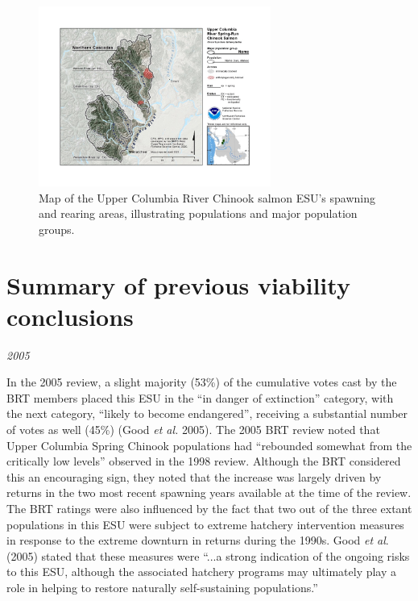 \documentclass[
  letterpaper,
  oneside,
  open=any]{scrbook}
\begin{document}
\begin{figure}

{\centering \includegraphics[width=3in,height=\textheight]{content/Interior_Columbia/../../media/image8.jpg}

}

\caption{\label{fig-UCR-Spr-Chinook-spawning-areas}Map of the Upper
Columbia River Chinook salmon ESU's spawning and rearing areas,
illustrating populations and major population groups.}

\end{figure}

\hypertarget{summary-of-previous-viability-conclusions-1}{%
\section{Summary of previous viability
conclusions}\label{summary-of-previous-viability-conclusions-1}}

\emph{2005}

In the 2005 review, a slight majority (53\%) of the cumulative votes
cast by the BRT members placed this ESU in the ``in danger of
extinction'' category, with the next category, ``likely to become
endangered'', receiving a substantial number of votes as well (45\%)
(Good \emph{et al.} 2005). The 2005 BRT review noted that Upper Columbia
Spring Chinook populations had ``rebounded somewhat from the critically
low levels'' observed in the 1998 review. Although the BRT considered
this an encouraging sign, they noted that the increase was largely
driven by returns in the two most recent spawning years available at the
time of the review. The BRT ratings were also influenced by the fact
that two out of the three extant populations in this ESU were subject to
extreme hatchery intervention measures in response to the extreme
downturn in returns during the 1990s. Good \emph{et al}. (2005) stated
that these measures were ``...a strong indication of the ongoing risks
to this ESU, although the associated hatchery programs may ultimately
play a role in helping to restore naturally self-sustaining
populations.''
\end{document}
